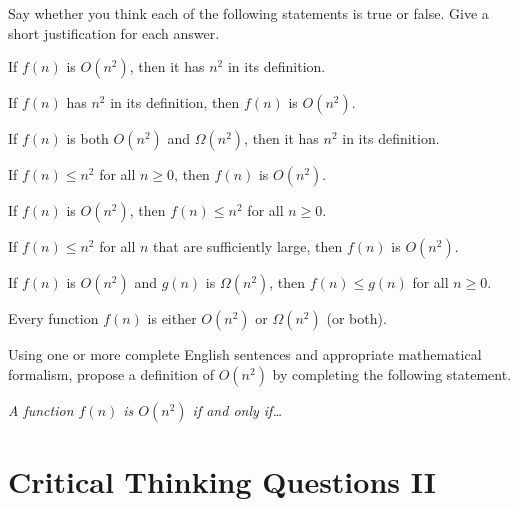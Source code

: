 \documentclass{tufte-handout}
\begin{document}
\noindent Say whether you think each of the following statements is
true or false.  Give a short justification for each answer.

\begin{questions}
\item If $f(n)$ is $O(n^2)$, then it has $n^2$ in its definition.
\item If $f(n)$ has $n^2$ in its definition, then $f(n)$ is $O(n^2)$.
\item If $f(n)$ is both $O(n^2)$ and $\Omega(n^2)$, then it has $n^2$
  in its definition.
\item If $f(n) \leq n^2$ for all $n \geq 0$, then $f(n)$ is $O(n^2)$.
\item If $f(n)$ is $O(n^2)$, then $f(n) \leq n^2$ for all $n \geq 0$.
\item If $f(n) \leq n^2$ for all $n$ that are sufficiently large, then
  $f(n)$ is $O(n^2)$.
\item If $f(n)$ is $O(n^2)$ and $g(n)$ is $\Omega(n^2)$, then $f(n)
  \leq g(n)$ for all $n \geq 0$.
\item Every function $f(n)$ is either $O(n^2)$ or $\Omega(n^2)$ (or
  both).
  \newpage
\item Using one or more complete English sentences and appropriate
  mathematical formalism, propose a definition of $O(n^2)$ by
  completing the following statement.

  \emph{A function $f(n)$ is $O(n^2)$ if and only if\dots}
\end{questions}

\pause



\section{Critical Thinking Questions II}
\end{document}
